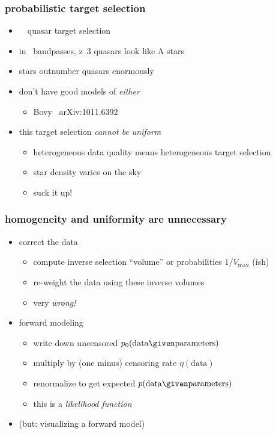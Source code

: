\documentclass[pdftex]{beamer}
\newcommand{\data}{\mbox{data}}
\newcommand{\pars}{\mbox{parameters}}
\begin{document}
\begin{frame}
  \frametitle{probabilistic target selection}
  \begin{itemize}
  \item \sdssiii\ \boss\ quasar target selection
  \item in \sdss\ bandpasses, z~3 quasars look like A stars
  \item stars outnumber quasars enormously
  \item don't have good models of \emph{either}
    \begin{itemize}
    \item Bovy \etal\ arXiv:1011.6392
    \end{itemize}
  \item this target selection \emph{cannot be uniform}
    \begin{itemize}
    \item heterogeneous data quality means heterogeneous target selection
    \item star density varies on the sky
    \item suck it up!
    \end{itemize}
  \end{itemize}
\end{frame}

\begin{frame}
  \frametitle{homogeneity and uniformity are unnecessary}
  \begin{itemize}
  \item correct the data
    \begin{itemize}
    \item compute inverse selection ``volume'' or probabilities $1 / V_{\mathrm{max}}$ (ish)
    \item re-weight the data using these inverse volumes
    \item very \emph{wrong!}
    \end{itemize}
  \item forward modeling
    \begin{itemize}
    \item write down uncensored $p_0(\data\given\pars)$
    \item multiply by (one minus) censoring rate $\eta(\data)$
    \item renormalize to get expected $p(\data\given\pars)$
    \item this is a \emph{likelihood function}
    \end{itemize}
  \item (but: visualizing a forward model)
  \end{itemize}
\end{frame}
\end{document}
